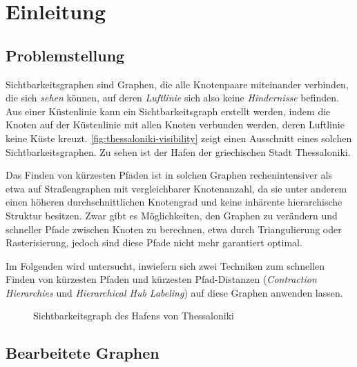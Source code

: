 \chapter{Einleitung}

\section{Problemstellung}
Sichtbarkeitsgraphen sind Graphen, die alle Knotenpaare miteinander verbinden, die sich \emph{sehen} können, auf deren \emph{Luftlinie} sich also keine \emph{Hindernisse} befinden.
Aus einer Küstenlinie kann ein Sichtbarkeitsgraph erstellt werden, indem die Knoten auf der Küstenlinie mit allen Knoten verbunden werden, deren Luftlinie keine Küste kreuzt.
\autoref{fig:thessaloniki-visibility} zeigt einen Ausschnitt eines solchen Sichtbarkeitsgraphen.
Zu sehen ist der Hafen der griechischen Stadt Thessaloniki.

Das Finden von kürzesten Pfaden ist in solchen Graphen rechenintensiver als etwa auf Straßengraphen mit vergleichbarer Knotenanzahl, da sie unter anderem einen höheren durchschnittlichen Knotengrad und keine inhärente hierarchische Struktur besitzen.
Zwar gibt es Möglichkeiten, den Graphen zu verändern und schneller Pfade zwischen Knoten zu berechnen, etwa durch Triangulierung oder Rasterisierung, jedoch sind diese Pfade nicht mehr garantiert optimal.

Im Folgenden wird untersucht, inwiefern sich zwei Techniken zum schnellen Finden von kürzesten Pfaden und kürzesten Pfad-Distanzen (\emph{Contraction Hierarchies} und \emph{Hierarchical Hub Labeling}) auf diese Graphen anwenden lassen.

\begin{figure}[ht]%
    \centering
    \caption{Sichtbarkeitsgraph des Hafens von Thessaloniki}%
    \label{fig:thessaloniki-visibility}%
\end{figure}

\section{Bearbeitete Graphen}

